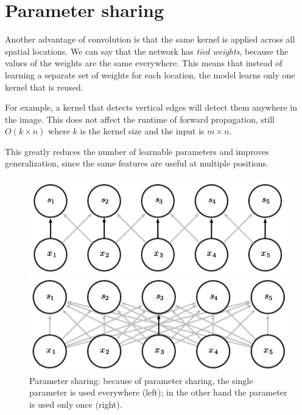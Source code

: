 \section{Parameter sharing}

Another advantage of convolution is that the same kernel is applied across all spatial locations.  
We can say that the network has \textit{tied weights}, because the values of the weights are the same everywhere. This means that instead of learning a separate set of weights for each location, the model learns only one kernel that is reused.  

For example, a kernel that detects vertical edges will detect them anywhere in the image. This does not affect the runtime of forward propagation, still $O(k\times n)$ where $k$ is the kernel size and the input is $m\times n$.

\clearpage

This greatly reduces the number of learnable parameters and improves generalization, since the same features are useful at multiple positions.

\begin{figure}[H]
    \centering
    \begin{minipage}{0.45\textwidth}
        \centering
        \includegraphics[width=\linewidth]{Images/Chapters/param_sharing2.png}
    \end{minipage}
    \hfill
    \begin{minipage}{0.45\textwidth}
        \centering
        \includegraphics[width=\linewidth]{Images/Chapters/param_sharing1.png}
    \end{minipage}
    \caption{Parameter sharing: because of parameter sharing, the single parameter is used everywhere (left); in the other hand the parameter is used only once (right).}
    \label{fig:param_sharing}
\end{figure}

